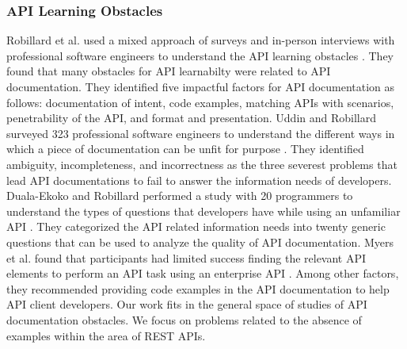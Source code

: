 \subsubsection{API Learning Obstacles}
Robillard et al. used a mixed approach of surveys and in-person interviews with professional software engineers to understand the API learning obstacles \cite{Robillard_what_makes} \cite{Robillard_a_field_study}. They found that many obstacles for API learnabilty were related to API documentation. They identified five impactful factors for API documentation as follows: documentation of intent, code examples, matching APIs with scenarios, penetrability of the API, and format and presentation. Uddin and Robillard surveyed 323 professional software engineers to understand the different ways in which a piece of documentation can be unfit for purpose \cite{g_uddin}. They identified ambiguity, incompleteness, and incorrectness as the three severest problems that lead API documentations to fail to answer the information needs of developers. Duala-Ekoko and Robillard performed a study with 20 programmers to understand the types of questions that developers have while using an unfamiliar API \cite{Duala-Ekoko:2012:AAQ:2337223.2337255}. They categorized the API related information needs into twenty generic questions that can be used to analyze the quality of API documentation. Myers et al. found that participants had limited success finding the relevant API elements to perform an API task using an enterprise API \cite{Myers_study}. Among other factors, they recommended providing code examples in the API documentation to help API client developers. Our work fits in the general space of studies of API documentation obstacles. We focus on problems related to the absence of examples within the area of REST APIs.

